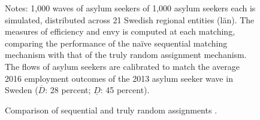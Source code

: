\documentclass[12pt,fleqn]{article}
\begin{document}
\begin{center}
\begin{figure}
	\caption{Comparison of sequential and truly random assignments \label{FIG-bad_assignments}.}
	\begin{center}


	\end{center}
		{\scriptsize \vspace{-1em}
	\begin{singlespace}
		{\sc Notes:} 1,000 waves of asylum seekers of 1,000 asylum seekers each is simulated, distributed across 21 Swedish regional entities (l{\"a}n). The measures of efficiency and envy is computed at each matching, comparing the performance of the na\"{i}ve sequential matching mechanism with that of the truly random assignment mechanism. The flows of asylum seekers are calibrated to match the average 2016 employment outcomes of the 2013 asylum seeker wave in Sweden ($\overline{D}$: 28 percent; $\underline{D}$: 45 percent).
	\end{singlespace}
	 }
\end{figure}
\end{center}
\end{document}

